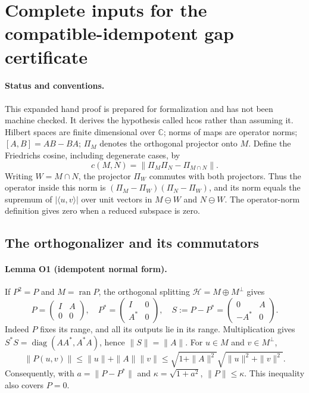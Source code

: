 \section{Complete inputs for the compatible-idempotent gap certificate}
\label{urgent:oblique}

\paragraph{Status and conventions.}
This expanded hand proof is prepared for formalization and has not been
machine checked. It derives the hypothesis called hcos rather than assuming
it. Hilbert spaces are finite dimensional over $\mathbb C$; norms of maps
are operator norms; $[A,B]=AB-BA$; $\Pi_M$ denotes the orthogonal projector
onto $M$. Define the Friedrichs cosine, including degenerate cases, by
\[
 c(M,N)=\|\Pi_M\Pi_N-\Pi_{M\cap N}\|.
\]
Writing $W=M\cap N$, the projector $\Pi_W$ commutes with both projectors.
Thus the operator inside this norm is
$(\Pi_M-\Pi_W)(\Pi_N-\Pi_W)$, and its norm equals the supremum of
$|\langle u,v\rangle|$ over unit vectors in $M\ominus W$ and $N\ominus W$.
The operator-norm definition gives zero when a reduced subspace is zero.

\subsection{The orthogonalizer and its commutators}

\paragraph{Lemma O1 (idempotent normal form).}
If $P^2=P$ and $M=\operatorname{ran}P$, the orthogonal splitting
$\mathcal H=M\oplus M^\perp$ gives
\[
 P=\begin{pmatrix}I&A\\0&0\end{pmatrix},\quad
 P^*=\begin{pmatrix}I&0\\A^*&0\end{pmatrix},\quad
 S:=P-P^*=\begin{pmatrix}0&A\\-A^*&0\end{pmatrix}.
\]
Indeed $P$ fixes its range, and all its outputs lie in its range.
Multiplication gives $S^*S=\operatorname{diag}(AA^*,A^*A)$, hence
$\|S\|=\|A\|$. For $u\in M$ and $v\in M^\perp$,
\[
 \|P(u,v)\|\leq\|u\|+\|A\|\|v\|
 \leq\sqrt{1+\|A\|^2}\sqrt{\|u\|^2+\|v\|^2}.
\]
Consequently, with $a=\|P-P^*\|$ and $\kappa=\sqrt{1+a^2}$,
$\|P\|\leq\kappa$. This inequality also covers $P=0$.

